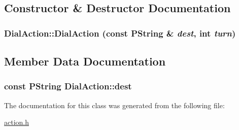 \subsection{Constructor \& Destructor Documentation}
\hypertarget{classDialAction_a6a4f34c622b886eedb04dca71e6baf7}{
\subsubsection[{DialAction}]{\setlength{\rightskip}{0pt plus 5cm}DialAction::DialAction (const PString \& {\em dest}, \/  int {\em turn})}}
\label{classDialAction_a6a4f34c622b886eedb04dca71e6baf7}




\subsection{Member Data Documentation}
\hypertarget{classDialAction_bd0ac2dd8e233138e05392eee0c743c7}{
\subsubsection[{dest}]{\setlength{\rightskip}{0pt plus 5cm}const PString {\bf DialAction::dest}}}
\label{classDialAction_bd0ac2dd8e233138e05392eee0c743c7}




The documentation for this class was generated from the following file:\begin{CompactItemize}
\item 
\hyperlink{action_8h}{action.h}\end{CompactItemize}
